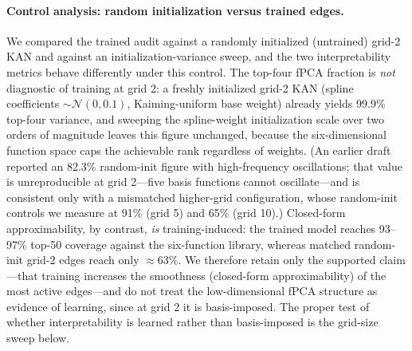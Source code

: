 \documentclass[11pt]{article}
\begin{document}
\paragraph{Control analysis: random initialization versus trained edges.}
We compared the trained audit against a randomly initialized (untrained) grid-2 KAN and against an initialization-variance sweep, and the two interpretability metrics behave differently under this control. The top-four fPCA fraction is \emph{not} diagnostic of training at grid 2: a freshly initialized grid-2 KAN (spline coefficients \(\sim\mathcal{N}(0,0.1)\), Kaiming-uniform base weight) already yields 99.9\% top-four variance, and sweeping the spline-weight initialization scale over two orders of magnitude leaves this figure unchanged, because the six-dimensional function space caps the achievable rank regardless of weights. (An earlier draft reported an 82.3\% random-init figure with high-frequency oscillations; that value is unreproducible at grid 2---five basis functions cannot oscillate---and is consistent only with a mismatched higher-grid configuration, whose random-init controls we measure at 91\% (grid 5) and 65\% (grid 10).) Closed-form approximability, by contrast, \emph{is} training-induced: the trained model reaches 93--97\% top-50 coverage against the six-function library, whereas matched random-init grid-2 edges reach only \(\approx\)63\%. We therefore retain only the supported claim---that training increases the smoothness (closed-form approximability) of the most active edges---and do not treat the low-dimensional fPCA structure as evidence of learning, since at grid 2 it is basis-imposed. The proper test of whether interpretability is learned rather than basis-imposed is the grid-size sweep below.
\end{document}
